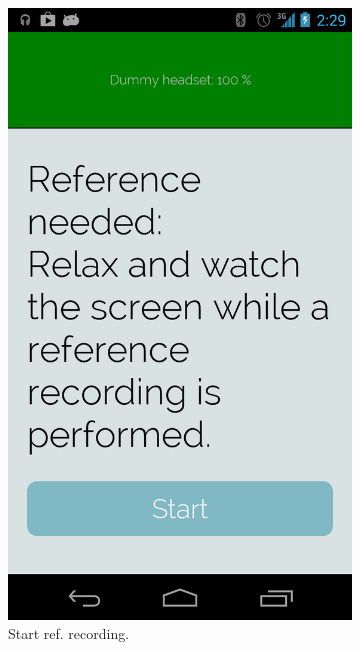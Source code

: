 \documentclass[a4paper,10pt,english,lof,lot,twoside]{puthesis}
\begin{document}
\begin{figure}
\begin{subfigure}[t]{0.30\linewidth}
\includegraphics[width=0.800\linewidth]{final-prototype-reference.png}
\caption[Start reference recording]{Start ref. recording.}\label{ch-design/index:fig-final-prototype-app-flow-prototype-reference}\end{subfigure}
\begin{subfigure}[t]{0.30\linewidth}
\centering
\capstart


\end{subfigure}
\end{figure}
\end{document}
